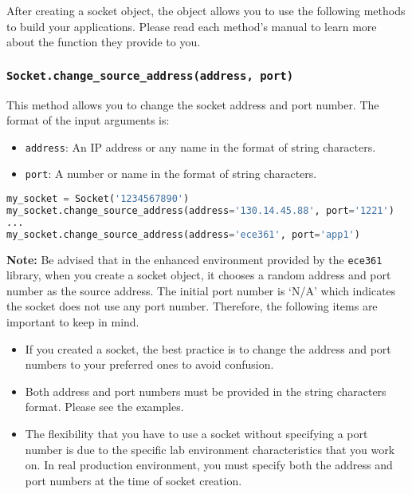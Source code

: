 \documentclass[11pt]{article}
\begin{document}
After creating a socket object, the object allows you to use the following methods to build your applications. Please read each method's manual to learn more about the function they provide to you.

\subsubsection{\texttt{Socket.\textbf{change\_source\_address(address, port)}}}
This method allows you to change the socket address and port number. The format of the input arguments is:
\begin{itemize}
    \item \texttt{address}: An IP address or any name in the format of string characters.
    \item \texttt{port}: A number or name in the format of string characters.
\end{itemize}

\begin{lstlisting}[caption={Example for using \texttt{change\_source\_address()}}, language=Python]
my_socket = Socket('1234567890')
my_socket.change_source_address(address='130.14.45.88', port='1221')
...
my_socket.change_source_address(address='ece361', port='app1')
\end{lstlisting}

\textbf{Note:}
Be advised that in the enhanced environment provided by the \texttt{ece361} library, when you create a socket object, it chooses a random address and port number as the source address. The initial port number is ‘N/A' which indicates the socket does not use any port number. Therefore, the following items are important to keep in mind.
\begin{itemize}
    \item If you created a socket, the best practice is to change the address and port numbers to your preferred ones to avoid confusion.
    \item Both address and port numbers must be provided in the string characters format. Please see the examples.
    \item The flexibility that you have to use a socket without specifying a port number is due to the specific lab environment characteristics that you work on. In real production environment, you must specify both the address and port numbers at the time of socket creation.
\end{itemize}
\end{document}

